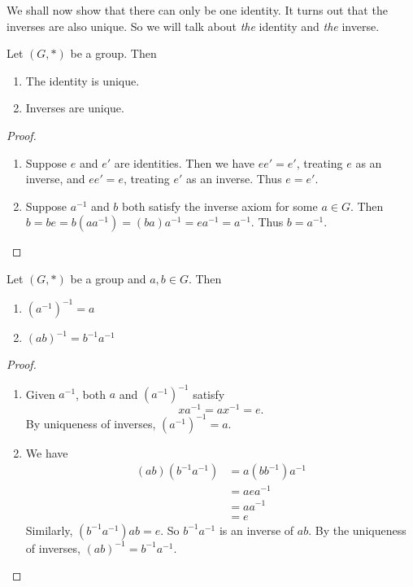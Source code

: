 \documentclass[a4paper]{article}
\begin{document}
We shall now show that there can only be one identity. It turns out that the inverses are also unique. So we will talk about \emph{the} identity and \emph{the} inverse.
\begin{prop}
  Let $(G, *)$ be a group. Then
  \begin{enumerate}
    \item The identity is unique.
    \item Inverses are unique.
  \end{enumerate}
\end{prop}
\begin{proof}\leavevmode
  \begin{enumerate}[label=(\roman{*})]
    \item Suppose $e$ and $e'$ are identities. Then we have $ee' = e'$, treating $e$ as an inverse, and $ee' = e$, treating $e'$ as an inverse. Thus $e = e'$.
    \item Suppose $a^{-1}$ and $b$ both satisfy the inverse axiom for some $a\in G$. Then $b = be = b(aa^{-1}) = (ba)a^{-1} = ea^{-1} = a^{-1}$. Thus $b = a^{-1}$.
  \end{enumerate}
\end{proof}
\begin{prop}
  Let $(G, *)$ be a group and $a, b\in G$. Then
  \begin{enumerate}
    \item $(a^{-1})^{-1} = a$
    \item $(ab)^{-1} = b^{-1}a^{-1}$
  \end{enumerate}
\end{prop}
\begin{proof}\leavevmode
  \begin{enumerate}
    \item Given $a^{-1}$, both $a$ and  $(a^{-1})^{-1}$ satisfy
      \[
        xa^{-1} = ax^{-1} = e.
      \]
      By uniqueness of inverses, $(a^{-1})^{-1} = a$.
    \item We have
      \begin{align*}
        (ab)(b^{-1}a^{-1}) &= a(bb^{-1})a^{-1} \\
        &= aea^{-1}\\
        &= aa^{-1}\\
        &= e
      \end{align*}
      Similarly, $(b^{-1}a^{-1})ab = e$. So $b^{-1}a^{-1}$ is an inverse of $ab$. By the uniqueness of inverses, $(ab)^{-1} = b^{-1}a^{-1}$.
  \end{enumerate}
\end{proof}
\end{document}
